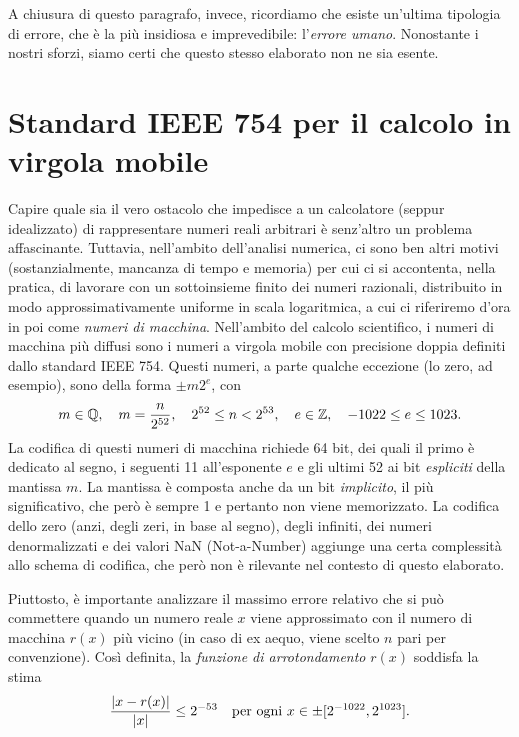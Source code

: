 A chiusura di questo paragrafo, invece, ricordiamo che esiste un'ultima
tipologia di errore, che è la più insidiosa e imprevedibile: l'\emph{errore umano}.
Nonostante i nostri sforzi, siamo certi che questo stesso elaborato non ne sia esente.

\section{Standard IEEE 754 per il calcolo in virgola mobile} \label{sec:ieee754}


Capire quale sia il vero ostacolo che impedisce a un calcolatore (seppur idealizzato)
di rappresentare numeri reali arbitrari è senz'altro un problema affascinante.
Tuttavia, nell'ambito dell'analisi numerica, ci sono ben altri motivi
(sostanzialmente, mancanza di tempo e memoria) per cui ci si accontenta,
nella pratica, di lavorare con un sottoinsieme finito dei numeri razionali,
distribuito in modo approssimativamente uniforme in scala logaritmica,
a cui ci riferiremo d'ora in poi come \emph{numeri di macchina}.
Nell'ambito del calcolo scientifico, i numeri di macchina più diffusi
sono i numeri a virgola mobile con precisione doppia definiti dallo standard IEEE 754.
Questi numeri, a parte qualche eccezione (lo zero, ad esempio),
sono della forma $\pm m 2^e$, con
\[
m \in \mathbb{Q},
\quad m = \frac{n}{2^{52}},
\quad 2^{52} \leq n < 2^{53},
\quad e \in \mathbb{Z},
\quad -1022 \leq e \leq 1023.
\]
La codifica di questi numeri di macchina richiede 64 bit, dei quali
il primo è dedicato al segno, i seguenti 11 all'esponente $e$
e gli ultimi 52 ai bit \emph{espliciti} della mantissa $m$.
La mantissa è composta anche da un bit \emph{implicito}, il più significativo,
che però è sempre 1 e pertanto non viene memorizzato.
La codifica dello zero (anzi, degli zeri, in base al segno),
degli infiniti, dei numeri denormalizzati e dei valori NaN (Not-a-Number)
aggiunge una certa complessità allo schema di codifica,
che però non è rilevante nel contesto di questo elaborato.

Piuttosto, è importante analizzare il massimo errore relativo che
si può commettere quando un numero reale $x$ viene
approssimato con il numero di macchina $r(x)$ più vicino
(in caso di ex aequo, viene scelto $n$ pari per convenzione).
Così definita, la \emph{funzione di arrotondamento} $r(x)$
soddisfa la stima
\begin{equation} \label{eq:stima}
\frac{\left\lvert x-r(x)\right\rvert}{\left\lvert x\right\rvert} \leq 2^{-53}
\quad \text{per ogni $x \in \pm [2^{-1022}, 2^{1023}]$}.
\end{equation}

